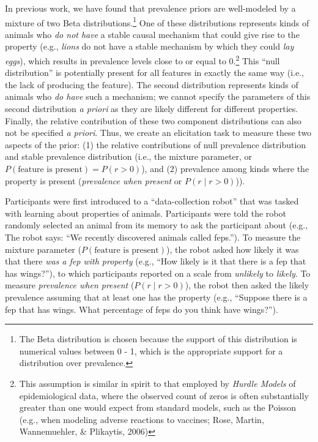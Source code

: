 \documentclass[floatsintext,doc]{apa6}
\theoremstyle{definition}
\theoremstyle{definition}
\theoremstyle{definition}
\theoremstyle{remark}
\begin{document}
In previous work, we have found that prevalence priors are well-modeled
by a mixture of two Beta distributions.\footnote{The Beta distribution
  is chosen because the support of this distribution is numerical values
  between 0 - 1, which is the appropriate support for a distribution
  over prevalence.} One of these distributions represents kinds of
animals who \emph{do not have} a stable causal mechanism that could give
rise to the property (e.g., \emph{lions} do not have a stable mechanism
by which they could \emph{lay eggs}), which results in prevalence levels
close to or equal to 0.\footnote{This assumption is similar in spirit to
  that employed by \emph{Hurdle Models} of epidemiological data, where
  the observed count of zeros is often substantially greater than one
  would expect from standard models, such as the Poisson (e.g., when
  modeling adverse reactions to vaccines; Rose, Martin, Wannemuehler, \&
  Plikaytis, 2006)} This \enquote{null distribution} is potentially
present for all features in exactly the same way (i.e., the lack of
producing the feature). The second distribution represents kinds of
animals who \emph{do have} such a mechanism; we cannot specify the
parameters of this second distribution \emph{a priori} as they are
likely different for different properties. Finally, the relative
contribution of these two component distributions can also not be
specified \emph{a priori}. Thus, we create an elicitation task to
measure these two aspects of the prior: (1) the relative contributions
of null prevalence distribution and stable prevalence distribution
(i.e., the mixture parameter, or
\(P(\text{feature is present}) = P(r > 0)\)), and (2) prevalence among
kinds where the property is present (\emph{prevalence when present} or
\(P(r \mid r > 0)\))).


Participants were first introduced to a \enquote{data-collection robot}
that was tasked with learning about properties of animals. Participants
were told the robot randomly selected an animal from its memory to ask
the participant about (e.g., The robot says: \enquote{We recently
discovered animals called feps.}). To measure the mixture parameter
(\(P(\text{feature is present})\)), the robot asked how likely it was
that there \emph{was a fep with property} (e.g., \enquote{How likely is
it that there is a fep that has wings?}), to which participants reported
on a scale from \emph{unlikely} to \emph{likely}. To measure
\emph{prevalence when present} (\(P(r \mid r > 0)\)), the robot then
asked the likely prevalence assuming that at least one has the property
(e.g., \enquote{Suppose there is a fep that has wings. What percentage
of feps do you think have wings?}).
\end{document}

